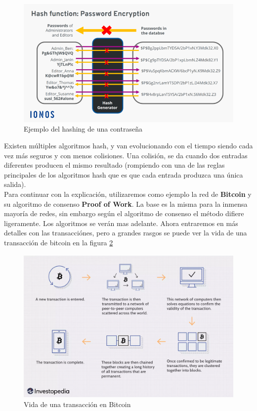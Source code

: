 \begin{figure}[h!]
  \centering
  \includegraphics[width=0.8\linewidth]{figs/EstadoArte/Blockchain/hash}
  \caption[Ejemplo del hashing de una contraseña]{Ejemplo del hashing de una contraseña}
  \label{fig:hash}
\end{figure}

Existen múltiples algoritmos hash, y van evolucionando con el tiempo siendo cada vez más seguros y con menos colisiones. Una colisión, se da cuando dos entradas diferentes producen el mismo resultado (rompiendo con una de las reglas principales de los algoritmos hash que es que cada entrada produzca una única salida). \\

Para continuar con la explicación, utilizaremos como ejemplo la red de \textbf{Bitcoin}\cite{whatIsBitcoin} y su algoritmo de consenso \textbf{Proof of Work}\cite{whatIsProofOfWork}. La base es la misma para la inmensa mayoría de redes, sin embargo según el algoritmo de consenso el método difiere ligeramente. Los algoritmos se verán mas adelante. Ahora entraremos en más detalles con las transacciónes, pero a grandes rasgos se puede ver la vida de una transacción de bitcoin en la figura \ref{fig:bitcoin}

\begin{figure}[h!]
  \centering
  \includegraphics[width=0.8\linewidth]{figs/EstadoArte/Blockchain/bitcoinMining}
  \caption[Vida de una transacción en Bitcoin]{Vida de una transacción en Bitcoin}
  \label{fig:bitcoin}
\end{figure}

